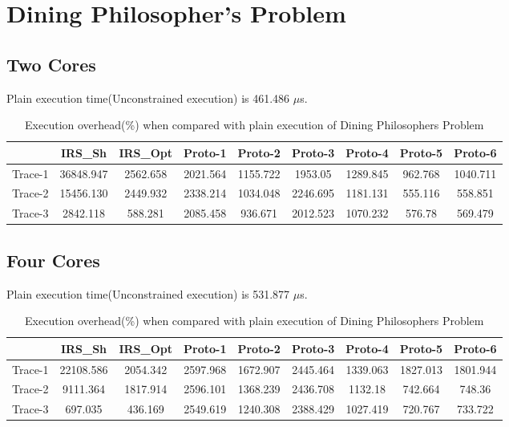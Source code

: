 \section{Dining Philosopher's Problem}

\subsection{Two Cores}
Plain execution time(Unconstrained execution) is 461.486 $\mu$s.
\begin{table}[h]
\begin{center}
 \begin{tabular}{|c c c c c c c c c|} 
 \hline
 & IRS\_Sh & IRS\_Opt& Proto-1 & Proto-2 & Proto-3 & Proto-4 & Proto-5 & Proto-6\\ %
 \hline
Trace-1 & 36848.947 & 2562.658 & 2021.564 & 1155.722 & 1953.05 & 1289.845 & 962.768 & 1040.711\\
Trace-2 & 15456.130 & 2449.932 & 2338.214 & 1034.048 & 2246.695 & 1181.131 & 555.116 & 558.851\\
Trace-3 & 2842.118 & 588.281 & 2085.458 & 936.671 & 2012.523 & 1070.232 & 576.78 & 569.479\\
\hline
\end{tabular}
\end{center}
\caption{Execution overhead(\%) when compared with plain execution of Dining Philosophers Problem}
\label{dining_phil_irs_res_cores_2}
\end{table}


\subsection{Four Cores}
Plain execution time(Unconstrained execution) is 531.877 $\mu$s.
\begin{table}[h]
\begin{center}
 \begin{tabular}{|c c c c c c c c c|} 
 \hline
 & IRS\_Sh & IRS\_Opt& Proto-1 & Proto-2 & Proto-3 & Proto-4 & Proto-5 & Proto-6\\ %
 \hline
Trace-1 & 22108.586 & 2054.342 & 2597.968 & 1672.907 & 2445.464 & 1339.063 & 1827.013 & 1801.944\\
Trace-2 & 9111.364 & 1817.914 & 2596.101 & 1368.239 & 2436.708 & 1132.18 & 742.664 & 748.36\\
Trace-3 & 697.035 & 436.169 & 2549.619 & 1240.308 & 2388.429 & 1027.419 & 720.767 & 733.722\\
\hline
\end{tabular}
\end{center}
\caption{Execution overhead(\%) when compared with plain execution of Dining Philosophers Problem}
\label{dining_phil_irs_res_cores_4}
\end{table}

